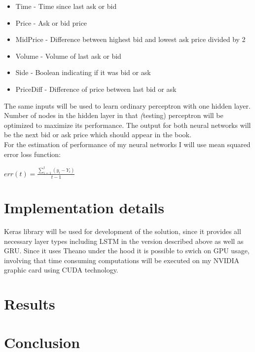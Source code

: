 \documentclass[twoside]{article}
\begin{document}
\begin{multicols}{2}
\begin{itemize}
\item Time - Time since last ask or bid
\item Price - Ask or bid price
\item MidPrice - Difference between highest bid and lowest ask price divided by 2
\item Volume - Volume of last ask or bid
\item Side - Boolean indicating if it was bid or ask
\item PriceDiff - Difference of price between last bid or ask
\end{itemize}

The same inputs will be used to learn ordinary perceptron with one hidden layer. Number of nodes in the hidden layer in that \emph(testing)
perceptron will be optimized to maximize its performance. The output for both neural networks will be the next bid or ask price which should
appear in the book. \\
\newline
For the estimation of performance of my neural networks I will use mean squared error loss function: \\
\newline
\begin{center}
$ err(t) = \frac{\sum\limits_{i=1}^t (y_{i} - Y_{i})}{t - 1} $
\end{center}

\section{Implementation details}

Keras library will be used for development of the solution, since it provides all necessary layer types including LSTM in the version described
above as well as GRU. Since it uses Theano under the hood it is possible to swich on GPU usage, involving that time consuming computations
will be executed on my NVIDIA graphic card using CUDA technology.


\section{Results}

\section{Conclusion}


\end{multicols}
\end{document}
